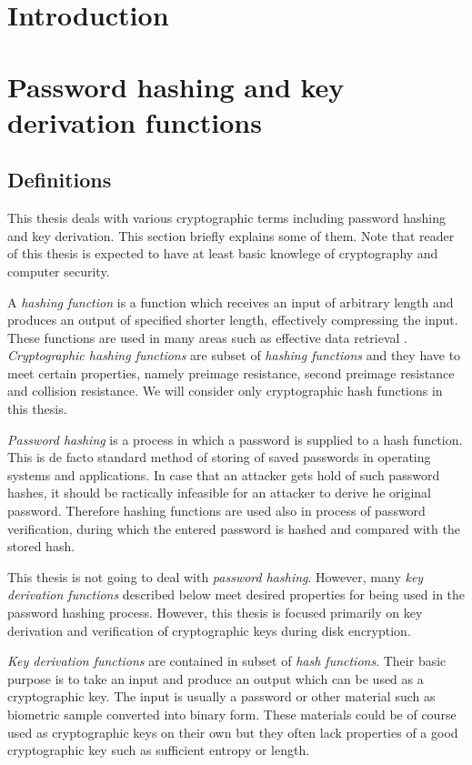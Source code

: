 \documentclass[nolof]{fithesis3}
\begin{document}
\chapter{Introduction}

\chapter{Password hashing and key derivation functions}

\section{Definitions}
\label{definitions}
This thesis deals with various cryptographic terms including password hashing and key derivation. This section briefly explains some of them. Note that reader of this thesis is expected to have at least basic knowlege of cryptography and computer security.

A \emph{hashing function} is a function which receives an input of arbitrary length and produces an output of specified shorter length, effectively compressing the input. These functions are used in many areas such as effective data retrieval \parencite{itmc14}. \emph{Cryptographic hashing functions} are subset of \emph{hashing functions} and they have to meet certain properties, namely preimage resistance, second preimage resistance and collision resistance. We will consider only cryptographic hash functions in this thesis.

\emph{Password hashing} is a process in which a password is supplied to a hash function. This is de facto standard method of storing of saved passwords in operating systems and applications. In case that an attacker gets hold of such password hashes, it should be ractically infeasible for an attacker to derive he original password. Therefore hashing functions are used also in process of password verification, during which the entered password is hashed and compared with the stored hash.

This thesis is not going to deal with \emph{password hashing}. However, many \emph{key derivation functions} described below meet desired properties for being used in the password hashing process. However, this thesis is focused primarily on key derivation and verification of cryptographic keys during disk encryption.

\emph{Key derivation functions} are contained in subset of \emph{hash functions}. Their basic purpose is to take an input and produce an output which can be used as a cryptographic key. The input is usually a password or other material such as biometric sample converted into binary form. These materials could be of course used as cryptographic keys on their own but they often lack properties of a good cryptographic key such as sufficient entropy or length. 
\end{document}
